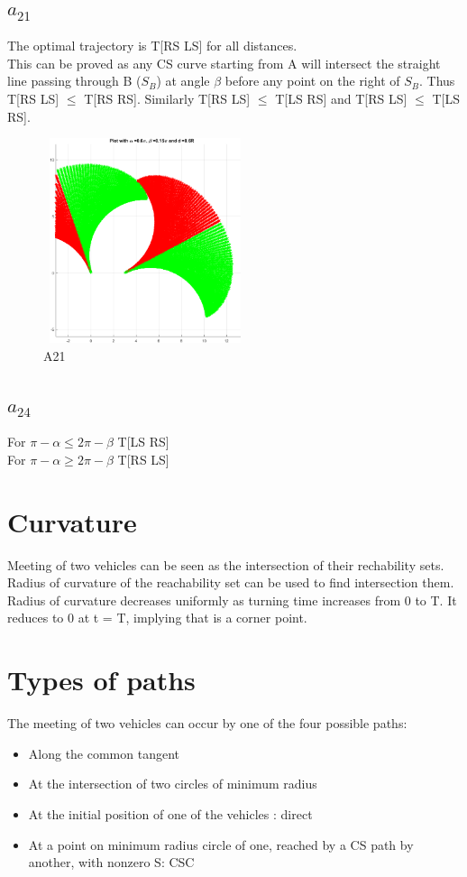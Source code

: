 \documentclass[11pt]{article} %
\begin{document}
\subsection{$a_{21}$}
The optimal trajectory is T[RS LS] for all distances.\\
This can be proved as any CS curve starting from A will intersect the straight line passing through B ($S_B$) at angle $\beta$ before any point on the right of $S_B$. Thus T[RS LS] $\leq$ T[RS RS]. Similarly T[RS LS] $\leq$ T[LS RS] and T[RS LS] $\leq$ T[LS RS].
\begin{figure}[H]
\includegraphics[width=6cm,height=6cm,keepaspectratio]{a21_1.png}
\caption{A21}
\end{figure}
\subsection{$a_{24}$}
For $\pi-\alpha \leq 2\pi-\beta$ T[LS RS]\\
For $\pi-\alpha \geq 2\pi-\beta$ T[RS LS]

\section{Curvature}
Meeting of two vehicles can be seen as the intersection of their rechability sets. Radius of curvature of the reachability set can be used to find intersection them.\\
Radius of curvature decreases uniformly as turning time increases from 0 to T. It reduces to 0 at t = T, implying that is a corner point. 

\section{Types of paths}
The meeting of two vehicles can occur by one of the four possible paths:
\begin{itemize}
\item Along the common tangent
\item At the intersection of two circles of minimum radius 
\item At the initial position of one of the vehicles : direct
\item At a point on minimum radius circle of one, reached by a CS path by another, with nonzero S: CSC
\end{itemize}
\end{document}
